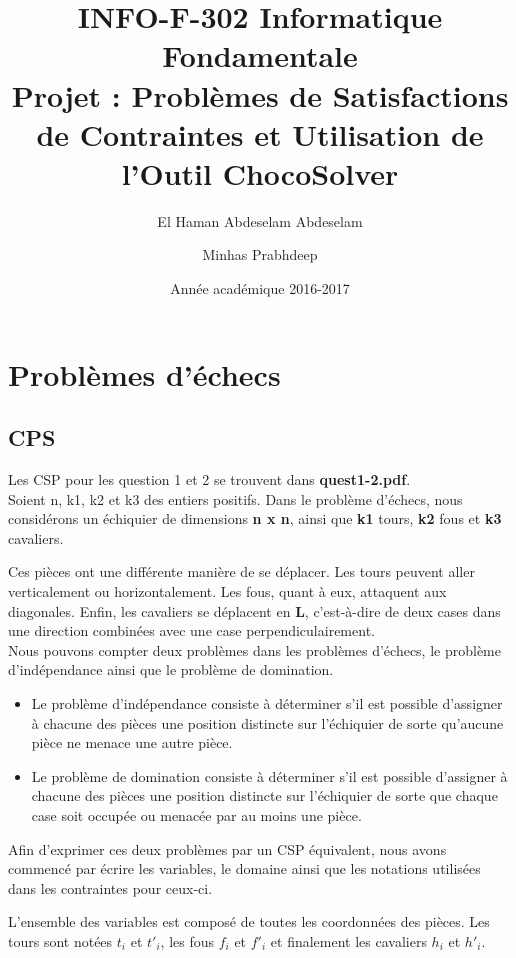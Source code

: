 \documentclass{article}
\title{INFO-F-302 Informatique Fondamentale\\ Projet : Problèmes de Satisfactions de Contraintes et Utilisation de l’Outil ChocoSolver}
\author{El Haman Abdeselam Abdeselam \and Minhas Prabhdeep}
\date{Année académique 2016-2017}
\begin{document}
\maketitle

\section{Problèmes d'échecs}

\subsection{CPS}
Les CSP pour les question 1 et 2 se trouvent dans \textbf{quest1-2.pdf}.\\

Soient n, k1, k2 et k3 des entiers positifs.
Dans le problème d'échecs, nous considérons un échiquier de dimensions \textbf{n x n}, ainsi que \textbf{k1} tours, \textbf{k2} fous et \textbf{k3} cavaliers. 

Ces pièces ont une différente manière de se déplacer. Les tours peuvent aller verticalement ou horizontalement. Les fous, quant à eux, attaquent aux diagonales. Enfin, les cavaliers se déplacent en \textbf{L}, c’est-à-dire de deux cases dans une direction combinées avec une case perpendiculairement. \\

Nous pouvons compter deux problèmes dans les problèmes d'échecs, le problème d'indépendance ainsi que le problème de domination.
\begin{itemize}
\item Le problème d'indépendance consiste à déterminer s'il est possible d'assigner à chacune des pièces une position distincte sur l'échiquier de sorte qu'aucune pièce ne menace une autre pièce.
\item Le problème de domination consiste à déterminer s'il est possible d'assigner à chacune des pièces une position distincte sur l'échiquier de sorte que chaque case soit occupée ou menacée par au moins une pièce. \\
\end{itemize}

Afin d'exprimer ces deux problèmes par un CSP équivalent, nous avons commencé par écrire les variables, le domaine ainsi que les notations utilisées dans les contraintes pour ceux-ci.

L'ensemble des variables est composé de toutes les coordonnées des pièces. Les tours sont notées $t_{i}$ et $t'_{i}$, les fous $f_{i}$ et $f'_{i}$ et finalement les cavaliers $h_{i}$ et $h'_{i}$.
\end{document}

